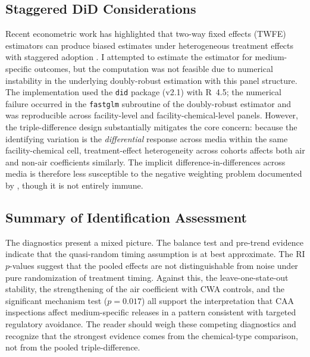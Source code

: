 \documentclass[12pt]{article}
\begin{document}
\subsection{Staggered DiD Considerations}

Recent econometric work has highlighted that two-way fixed effects (TWFE) estimators can produce biased estimates under heterogeneous treatment effects with staggered adoption \citep{callawaysantanna2021, dechaisemartin2020, sunab2021}. I attempted to estimate the \citet{callawaysantanna2021} estimator for medium-specific outcomes, but the computation was not feasible due to numerical instability in the underlying doubly-robust estimation with this panel structure. The implementation used the \texttt{did} package (v2.1) with R~4.5; the numerical failure occurred in the \texttt{fastglm} subroutine of the doubly-robust estimator and was reproducible across facility-level and facility-chemical-level panels. However, the triple-difference design substantially mitigates the core concern: because the identifying variation is the \textit{differential} response across media within the same facility-chemical cell, treatment-effect heterogeneity across cohorts affects both air and non-air coefficients similarly. The implicit difference-in-differences across media is therefore less susceptible to the negative weighting problem documented by \citet{dechaisemartin2020}, though it is not entirely immune.

\subsection{Summary of Identification Assessment}

The diagnostics present a mixed picture. The balance test and pre-trend evidence indicate that the quasi-random timing assumption is at best approximate. The RI $p$-values suggest that the pooled effects are not distinguishable from noise under pure randomization of treatment timing. Against this, the leave-one-state-out stability, the strengthening of the air coefficient with CWA controls, and the significant mechanism test ($p = 0.017$) all support the interpretation that CAA inspections affect medium-specific releases in a pattern consistent with targeted regulatory avoidance. The reader should weigh these competing diagnostics and recognize that the strongest evidence comes from the chemical-type comparison, not from the pooled triple-difference.


\end{document}
